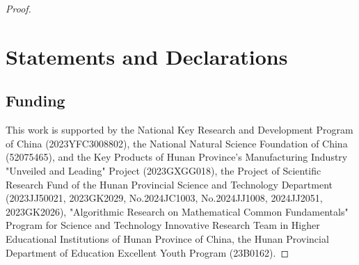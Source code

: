 \documentclass[pdflatex,sn-mathphys-num]{sn-jnl}%
\theoremstyle{thmstyleone}%
\theoremstyle{thmstyletwo}%
\theoremstyle{thmstylethree}%
\begin{document}
\begin{proof}





% 


% 
\section*{Statements and Declarations}
\subsection*{Funding}

This work is supported by the National Key Research and Development Program of China (2023YFC3008802), the National Natural Science Foundation of China (52075465), and the Key Products of Hunan Province's Manufacturing Industry "Unveiled and Leading" Project (2023GXGG018), the Project of Scientific Research Fund of the Hunan Provincial Science and Technology Department (2023JJ50021, 2023GK2029, No.2024JC1003, No.2024JJ1008, 2024JJ2051, 2023GK2026), "Algorithmic Research on Mathematical Common Fundamentals" Program for Science and Technology Innovative Research Team in Higher Educational Institutions of Hunan Province of China, the Hunan Provincial Department of Education Excellent Youth Program (23B0162).


\end{proof}
\end{document}
